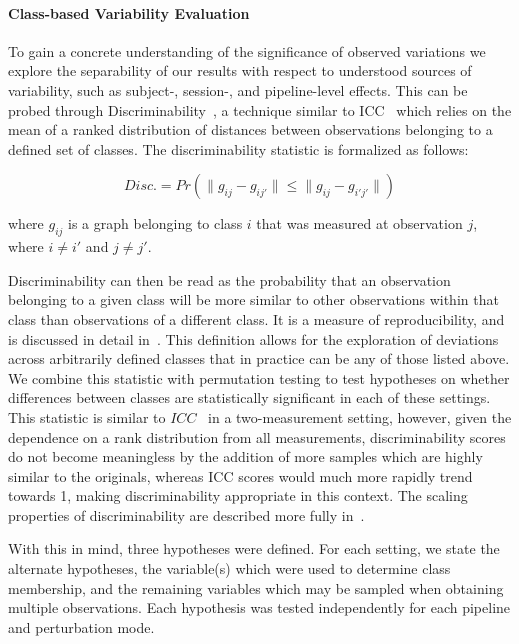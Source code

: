 \documentclass[10pt,letterpaper]{article}
\begin{document}
\paragraph{Class-based Variability Evaluation} To gain a concrete understanding of
the significance of observed variations we explore the separability of our results
with respect to understood sources of variability, such as subject-, session-, and
pipeline-level effects. This can be probed through
Discriminability~\cite{bridgeford2020elim}, a technique similar to
ICC~\cite{Bartko1966-tl} which relies on the mean of a ranked distribution of
distances between observations belonging to a defined set of classes. The
discriminability statistic is formalized as follows:

\begin{equation}
Disc. = Pr(\lVert g_{ij} - g_{ij'} \rVert \leq \lVert g_{ij} - g_{i'j'} \rVert)
\label{eq:sigdig}
\end{equation}

where $g_{ij}$ is a graph belonging to class $i$ that was measured at observation
$j$, where $i \neq i'$ and $j \neq j'$.

Discriminability can then be read as the probability that an observation belonging
to a given class will be more similar to other observations within that class than
observations of a different class. It is a measure of reproducibility, and is
discussed in detail in~\cite{bridgeford2020elim}. This definition allows for the
exploration of deviations across arbitrarily defined classes that in practice can be
any of those listed above. We combine this statistic with permutation testing to
test hypotheses on whether differences between classes are statistically significant
in each of these settings. This statistic is similar to $ICC$~\cite{Bartko1966-tl} in
a two-measurement setting, however, given the dependence on a rank distribution from
all measurements, discriminability scores do not become meaningless by the addition
of more samples which are highly similar to the originals, whereas ICC scores would
much more rapidly trend towards 1, making discriminability appropriate in this
context. The scaling properties of  discriminability are described more fully
in~.

With this in mind, three hypotheses were defined. For each setting, we state the
alternate hypotheses, the variable(s) which were used to determine class membership,
and the remaining variables which may be sampled when obtaining multiple observations.
Each hypothesis was tested independently for each pipeline and perturbation mode.
\end{document}

